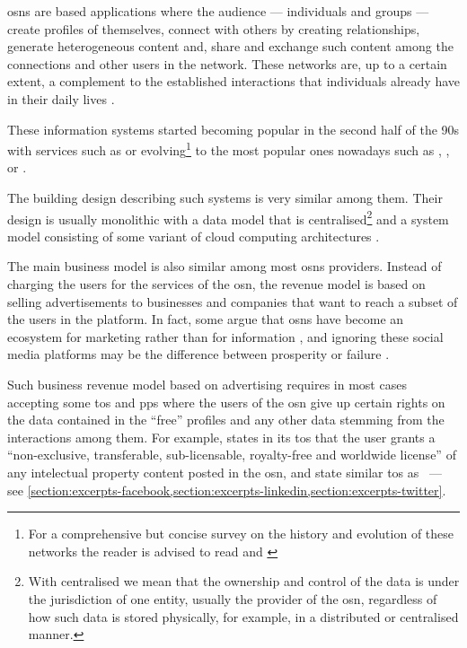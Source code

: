 \documentclass[showtrims,oldfontcommands]{kthesis}
\begin{document}
\Acp{osn} are \Internet based applications where the audience --- individuals and 
groups --- create profiles of themselves, connect with others by creating relationships, 
generate heterogeneous content and, share and exchange such content among the connections 
and other users in the network. These networks are, up to a certain extent, a complement 
to the established interactions that individuals already have in their daily lives 
\cite{SubrahmanyamRWE08}.

These information systems started becoming popular in the second half of the 90s 
with services such as \LiveJournal or \Friendster evolving\footnote{For a comprehensive 
but concise survey on the history and evolution of these networks the reader is 
advised to read \cite{boydE07} and \cite{HeidemannKP12}} to the most popular ones 
nowadays such as \Facebook, \LinkedIn, \Twitter or \GooglePlus.

The building design describing such systems is very similar among them. Their design 
is usually monolithic with a data model that is centralised\footnote{With centralised 
we mean that the ownership and control of the data is under the jurisdiction of 
one entity, usually the provider of the \ac{osn}, regardless of how such data is 
stored physically, for example, in a distributed or centralised manner.} and a system 
model consisting of some variant of cloud computing architectures \cite{PallisZD11}. 

The main business model is also similar among most \acp{osn} providers. Instead 
of charging the users for the services of the \ac{osn}, the revenue model is based 
on selling advertisements to businesses and companies that want to reach a subset 
of the users in the platform. In fact, some argue that \acp{osn} have become an 
ecosystem for marketing rather than for information \cite{HannaRC11}, and ignoring 
these social media platforms may be the difference between prosperity or failure 
\cite{HarrisR09}.

Such business revenue model based on advertising requires in most cases accepting 
some \ac{tos} and \acp{pp} where the users of the \ac{osn} give up certain rights 
on the data contained in the ``free'' profiles and any other data stemming from 
the interactions among them. For example, \Facebook states in its \ac{tos} that 
the user grants a ``non-exclusive, transferable, sub-licensable, royalty-free and 
worldwide license'' of any intelectual property content posted in the \ac{osn}, 
\LinkedIn and \Twitter state similar \ac{tos} as \Facebook~--- see \cref{section:excerpts-facebook,section:excerpts-linkedin,section:excerpts-twitter}.
\end{document}
